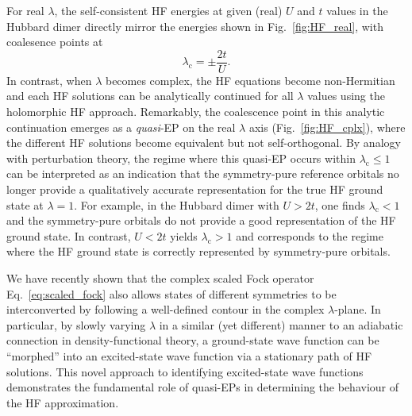 \documentclass[aps,prb,reprint,noshowkeys,superscriptaddress]{revtex4-1}
\newcommand{\hugh}[1]{\textcolor{hughgreen}{#1}}
\begin{document}
\hugh{For real $\lambda$, the self-consistent HF energies at given (real) $U$ and $t$ values
in the Hubbard dimer directly mirror the energies shown in Fig.~\ref{fig:HF_real}, 
with coalesence points at 
\begin{equation}
    \lambda_{\text{c}} = \pm \frac{2t}{U}.
    \label{eq:scaled_fock}
\end{equation}
In contrast, when $\lambda$ becomes complex, the HF equations become non-Hermitian and 
each HF solutions can be analytically continued for all $\lambda$ values using
the holomorphic HF approach.\cite{Hiscock_2014,Burton_2016,Burton_2018}
Remarkably, the coalescence point in this analytic continuation emerges as a 
\textit{quasi}-EP on the real $\lambda$ axis (Fig.~\ref{fig:HF_cplx}), where
the different HF solutions become equivalent but not self-orthogonal.\cite{Burton_2019}
By analogy with perturbation theory, the regime where this quasi-EP occurs 
within $\lambda_{\text{c}} \le 1$ can be interpreted as an indication that 
the symmetry-pure reference orbitals no longer provide a qualitatively 
accurate representation for the true HF ground state at $\lambda = 1$.
For example, in the Hubbard dimer with $U > 2t$, one finds $\lambda_{\text{c}} < 1$ and the symmetry-pure orbitals
do not provide a good representation of the HF ground state.
In contrast, $U < 2t$ yields $\lambda_{\text{c}} > 1$ and corresponds to
the regime where the HF ground state is correctly represented by symmetry-pure orbitals.
}

\hugh{We have recently shown that the complex scaled Fock operator Eq.~\eqref{eq:scaled_fock}
also allows states of different symmetries to be interconverted by following a well-defined
contour in the complex $\lambda$-plane.\cite{Burton_2019}
In particular, by slowly varying $\lambda$ in a similar (yet different) manner
to an adiabatic connection in density-functional theory,\cite{Langreth_1975,Gunnarsson_1976,Zhang_2004} 
a ground-state wave function can be ``morphed'' into an excited-state wave function 
via a stationary path of HF solutions.
This novel approach to identifying excited-state wave functions demonstrates the fundamental 
role of quasi-EPs in determining the behaviour of the HF approximation.} 
\end{document}
